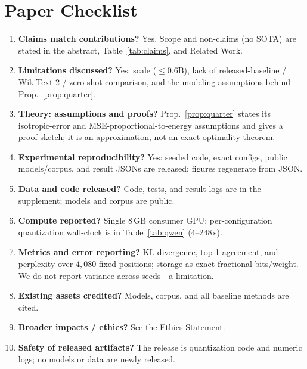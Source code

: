 \documentclass[10pt]{article}
\begin{document}
\section{Paper Checklist}
\begin{enumerate}\itemsep2pt
\item \textbf{Claims match contributions?} Yes. Scope and non-claims (no SOTA)
are stated in the abstract, Table~\ref{tab:claims}, and Related Work.
\item \textbf{Limitations discussed?} Yes: scale ($\le0.6$B), lack of
released-baseline / WikiText-2 / zero-shot comparison, and the modeling
assumptions behind Prop.~\ref{prop:quarter}.
\item \textbf{Theory: assumptions and proofs?} Prop.~\ref{prop:quarter} states
its isotropic-error and MSE-proportional-to-energy assumptions and gives a proof
sketch; it is an approximation, not an exact optimality theorem.
\item \textbf{Experimental reproducibility?} Yes: seeded code, exact configs,
public models/corpus, and result JSONs are released; figures regenerate from JSON.
\item \textbf{Data and code released?} Code, tests, and result logs are in the
supplement; models and corpus are public.
\item \textbf{Compute reported?} Single 8\,GB consumer GPU; per-configuration
quantization wall-clock is in Table~\ref{tab:qwen} (4--248\,s).
\item \textbf{Metrics and error reporting?} KL divergence, top-1 agreement, and
perplexity over $4{,}080$ fixed positions; storage as exact fractional
bits/weight. We do not report variance across seeds---a limitation.
\item \textbf{Existing assets credited?} Models, corpus, and all baseline methods
are cited.
\item \textbf{Broader impacts / ethics?} See the Ethics Statement.
\item \textbf{Safety of released artifacts?} The release is quantization code and
numeric logs; no models or data are newly released.
\end{enumerate}
\end{document}
